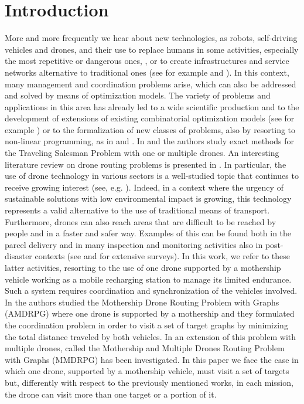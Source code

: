 \section{Introduction}
More and more frequently we hear about new technologies, as robots, self-driving vehicles and drones, and their use to replace humans in some activities, especially the most repetitive or dangerous ones, \cite{art:Chui2016}, or to create infrastructures and service networks alternative to traditional ones (see for example \cite{art:Chiaraviglio2019a} and \cite{art:Amorosi2019}). In this context, many management and coordination problems arise, which can also be addressed and solved by means of optimization models. The variety of problems and applications in this area has already led to a wide scientific production and to the development of extensions of existing combinatorial optimization models (see for example \cite{art:Pugliese2017}) or to the formalization of new classes of problems, also by resorting to non-linear programming, as in \cite{art:Amorosi2021} and \cite{art:Amorosi2021b}. 
In \cite{art:Cavani2021} and \cite{art:Roberti2021,art:***} the authors study exact methods for the Traveling Salesman Problem with one or multiple drones. An interesting literature review on drone routing problems is presented in \cite{art:Macrina2020}.
In particular, the use of drone technology in various sectors is a well-studied topic that continues to receive growing interest (see, e.g. \cite{art:***,art:**, art:WANG, art:VIDAL, art:MBIA}). Indeed, in a context where the urgency of sustainable solutions with low environmental impact is growing, this technology represents a valid alternative to the use of traditional means of transport. Furthermore, drones can also reach areas that are difficult to be reached by people and in a faster and safer way. Examples of this can be found both in the parcel delivery and in many inspection and monitoring activities also in post-disaster contexts (see \cite{art:Otto2018} and \cite{art:Chung2020} for extensive surveys).
In this work, we refer to these latter activities, resorting to the use of one drone supported by a mothership vehicle working as a mobile recharging station to manage its limited endurance. Such a system requires coordination and synchronization of the vehicles involved. In \cite{art:Amorosi2021} the authors studied the Mothership Drone Routing Problem with Graphs (AMDRPG) where one drone is supported by a mothership and they formulated the coordination problem in order to visit a set of target graphs by minimizing the total distance traveled by both vehicles. In \cite{art:Amorosi2021b} an extension of this problem with multiple drones, called the Mothership and Multiple Drones Routing Problem with Graphs (MMDRPG) has been investigated. In this paper we face the case in which one drone, supported by a mothership vehicle, must visit a set of targets but, differently with respect to the previously mentioned works, in each mission, the drone can visit more than one target or a portion of it.
